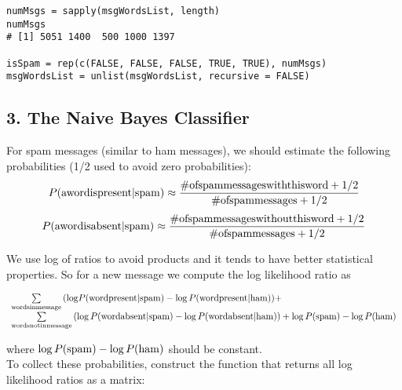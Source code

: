 \documentclass{article}
\begin{document}
\begin{verbatim}
numMsgs = sapply(msgWordsList, length)
numMsgs
# [1] 5051 1400  500 1000 1397

isSpam = rep(c(FALSE, FALSE, FALSE, TRUE, TRUE), numMsgs)
msgWordsList = unlist(msgWordsList, recursive = FALSE)
\end{verbatim}

\subsection*{3. The Naive Bayes Classifier}

For spam messages (similar to ham messages), we should estimate the following probabilities (1/2 used to avoid zero probabilities):
\[P({\rm{a word is present|spam}}) \approx \frac{{\# {\rm{of spam messages with this word}} + 1/2}}{{\# {\rm{of spam messages}} + 1/2}}\]
\[P({\rm{a word is absent|spam}}) \approx \frac{{\# {\rm{of spam messages without this word}} + 1/2}}{{\# {\rm{of spam messages}} + 1/2}}\]

We use log of ratios to avoid products and it tends to have better statistical properties. So for a new message we compute the log likelihood ratio as

\[\begin{array}{l}
\sum\limits_{{\rm{words in message}}} {(\log } P({\rm{word present|spam}}) - \log P({\rm{word present|ham}})) + \\
\sum\limits_{{\rm{words not in message}}} {(\log P({\rm{word absent|spam}}) - \log P({\rm{word absent|ham}})) + \log P({\rm{spam}}) - \log P({\rm{ham}})} 
\end{array}\]


where ${\log P({\rm{spam}}) - \log P({\rm{ham}})}$ should be constant. \\
To collect these probabilities, construct the function that returns all log likelihood ratios as a matrix:
\end{document}

